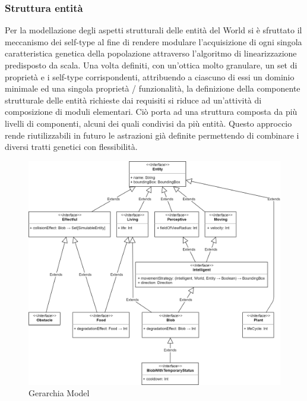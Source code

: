 \subsubsection{Struttura entità}
Per la modellazione degli aspetti strutturali delle entità del World si è sfruttato il meccanismo dei self-type al fine di rendere modulare l’acquisizione di ogni singola caratteristica genetica della popolazione attraverso l’algoritmo di linearizzazione predisposto da scala. Una volta definiti, con un’ottica molto granulare, un set di proprietà e i self-type corrispondenti, attribuendo a ciascuno di essi un dominio minimale ed una singola proprietà / funzionalità, la definizione della componente strutturale delle entità richieste dai requisiti si riduce ad un’attività di composizione di moduli elementari. Ciò porta ad una struttura composta da più livelli di componenti, alcuni dei quali condivisi da più entità. Questo approccio rende riutilizzabili in futuro le astrazioni già definite permettendo di combinare i diversi tratti genetici con flessibilità.
\begin{figure}[h!]
\centering
\includegraphics[width=\textwidth, scale=0.44]{img/ModelHierarchy.png}
\caption{Gerarchia Model}
\label{fig:modelhierarchy}
\end{figure}
